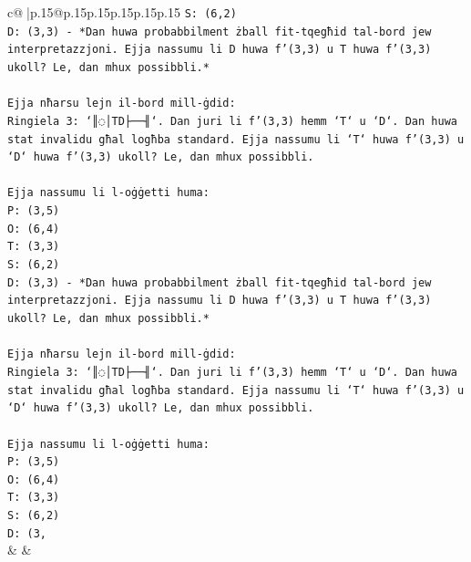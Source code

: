 \documentclass{article}
\begin{document}
{\begin{supertabular}{c@{$\;$}|p{.15\linewidth}@{}p{.15\linewidth}p{.15\linewidth}p{.15\linewidth}p{.15\linewidth}p{.15\linewidth}}
{{{\texttt{S: (6,2)} \\
\texttt{D: (3,3) {-} *Dan huwa probabbilment żball fit{-}tqegħid tal{-}bord jew interpretazzjoni. Ejja nassumu li D huwa f'(3,3) u T huwa f'(3,3) ukoll? Le, dan mhux possibbli.*} \\
\\ 
\texttt{Ejja nħarsu lejn il{-}bord mill{-}ġdid:} \\
\texttt{Ringiela 3: `║◌│TD├──╢`. Dan juri li f'(3,3) hemm `T` u `D`. Dan huwa stat invalidu għal logħba standard. Ejja nassumu li `T` huwa f'(3,3) u `D` huwa f'(3,3) ukoll? Le, dan mhux possibbli.} \\
\\ 
\texttt{Ejja nassumu li l{-}oġġetti huma:} \\
\texttt{P: (3,5)} \\
\texttt{O: (6,4)} \\
\texttt{T: (3,3)} \\
\texttt{S: (6,2)} \\
\texttt{D: (3,3) {-} *Dan huwa probabbilment żball fit{-}tqegħid tal{-}bord jew interpretazzjoni. Ejja nassumu li D huwa f'(3,3) u T huwa f'(3,3) ukoll? Le, dan mhux possibbli.*} \\
\\ 
\texttt{Ejja nħarsu lejn il{-}bord mill{-}ġdid:} \\
\texttt{Ringiela 3: `║◌│TD├──╢`. Dan juri li f'(3,3) hemm `T` u `D`. Dan huwa stat invalidu għal logħba standard. Ejja nassumu li `T` huwa f'(3,3) u `D` huwa f'(3,3) ukoll? Le, dan mhux possibbli.} \\
\\ 
\texttt{Ejja nassumu li l{-}oġġetti huma:} \\
\texttt{P: (3,5)} \\
\texttt{O: (6,4)} \\
\texttt{T: (3,3)} \\
\texttt{S: (6,2)} \\
\texttt{D: (3,} \\
            }
        }
    }
    & & \\ \\


\end{supertabular}}
\end{document}

